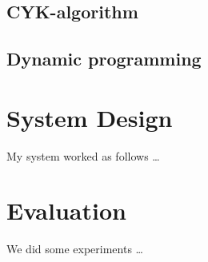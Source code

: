 \documentclass[a4paper, 11pt]{article}
\begin{document}

\subsection{CYK-algorithm}
\label{cyk}


\subsection{Dynamic programming}
\label{dp}





\pagebreak













\section{System Design}
\label{systemdesign}

My system worked as follows \ldots

\pagebreak













\section{Evaluation}

We did some experiments \ldots

\pagebreak





\end{document}
